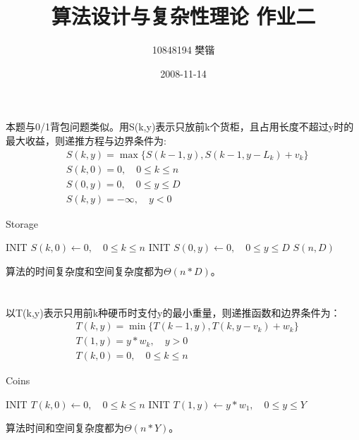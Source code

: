 \documentclass{article}
\title{算法设计与复杂性理论 作业二}
\author{10848194  樊锴}
\date{2008-11-14}
\begin{document}
\begin{CJK}{UTF8}{gbsn}

\maketitle
\section{}
本题与0/1背包问题类似。用S(k,y)表示只放前k个货柜，且占用长度不超过y时的最大收益，则递推方程与边界条件为:
\begin{align*}
& S(k,y)=\max\{S(k-1,y), S(k-1, y-L_k)+v_k\}	\\
& S(k,0)=0, 	\quad 0\le k\le n	\\
& S(0,y)=0, 	\quad 0\le y\le D	\\
& S(k,y)=-\infty, 	\quad y<0	
\end{align*}

\begin{algorithm}
\caption{Storage}
\begin{algorithmic}[1]
\STATE INIT $S(k,0) \gets 0,\quad0 \le k\le n$
\STATE INIT $S(0,y) \gets 0,\quad0 \le y\le D$
    \ELSE
    \ENDIF
\ENDFOR
\ENDFOR
\RETURN $S(n,D)$
\end{algorithmic}
\end{algorithm}

算法的时间复杂度和空间复杂度都为$\Theta(n*D)$。

\section{}
以T(k,y)表示只用前k种硬币时支付y的最小重量，则递推函数和边界条件为：
\begin{align*}
& T(k,y)=\min\{T(k-1,y),T(k,y-v_k)+w_k\} \\
& T(1,y)=y*w_k,\quad y>0    \\
& T(k,0)=0,\quad 0 \le k\le n
\end{align*}

\begin{algorithm}
\caption{Coins}
\begin{algorithmic}[1]
\STATE INIT $T(k,0) \gets 0,\quad0 \le k\le n$
\STATE INIT $T(1,y) \gets y*w_1,\quad0 \le y\le Y$
    \ELSE
    \ENDIF
\ENDFOR
\ENDFOR
\end{algorithmic}
\end{algorithm}
算法时间和空间复杂度都为$\Theta(n*Y)$。


\end{CJK}
\end{document}
